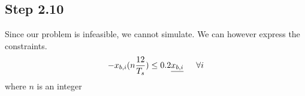 \subsection*{Step 2.10}
Since our problem is infeasible, we cannot simulate. We can however express the constraints.
\begin{align*}
    -x_{b,i}(n\frac{12}{T_s}) \leq 0.2 \underline{x_{b,i}} \indent \forall i
\end{align*}
where $n$ is an integer